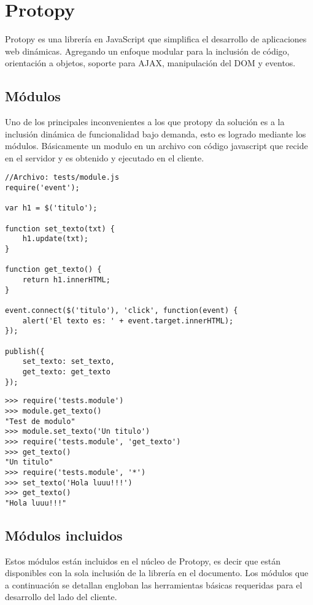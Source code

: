 \chapter{Protopy}
\label{ch:apendiceProtopy}
Protopy es una librería en JavaScript que simplifica el desarrollo de
aplicaciones web dinámicas.
Agregando un enfoque modular para la inclusión de código, orientación a objetos,
soporte para AJAX, manipulación del DOM y eventos.

\section{Módulos}
Uno de los principales inconvenientes a los que protopy da solución es a la
inclusión dinámica de funcionalidad bajo demanda,
esto es logrado mediante los módulos.
Básicamente un modulo en un archivo con código javascript que recide en el
servidor y es obtenido y ejecutado en el cliente.

\begin{lstlisting}[style=javascript,label=estructura-modulo,caption=Estructura
de un modulo]
//Archivo: tests/module.js
require('event');

var h1 = $('titulo');

function set_texto(txt) {
    h1.update(txt);
}

function get_texto() {
    return h1.innerHTML;
}

event.connect($('titulo'), 'click', function(event) {
    alert('El texto es: ' + event.target.innerHTML);
});

publish({
    set_texto: set_texto,
    get_texto: get_texto
});
\end{lstlisting}

\begin{lstlisting}[style=consola]
>>> require('tests.module')
>>> module.get_texto()
"Test de modulo"
>>> module.set_texto('Un titulo')
>>> require('tests.module', 'get_texto')
>>> get_texto()
"Un titulo"
>>> require('tests.module', '*')
>>> set_texto('Hola luuu!!!')
>>> get_texto()
"Hola luuu!!!"
\end{lstlisting}

\section{Módulos incluidos}
Estos módulos están incluidos en el núcleo de Protopy, es decir que están
disponibles con la sola inclusión de la librería en el documento.
Los módulos que a continuación se detallan engloban las herramientas básicas
requeridas para el desarrollo del lado del cliente.

